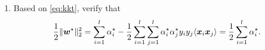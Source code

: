 \documentclass[a4paper]{article}
\begin{document}
{\begin{enumerate}
\begin{enumerate}
        \begin{proof}
            From a condition from the \eqref{eq:kkt}:
            \begin{equation*}
            \begin{aligned}
              & \sum_{i=1}^{l}\alpha_i^{\star}\left[y_i(\bw^{\star\T}\bx_i+b^{\star})-1\right] = 0 &\\
              & \sum_{i=1}^{l}\alpha_i^{\star}\left[(\bw^{\star\T}\bx_i+b^{\star})-y_i\right]  = 0 & 
            \end{aligned}
            \end{equation*}
            There is at least one $\alpha_j^{\star} > 0$ 
                that let $\bw^{\star\T}\bx_j + b^{\star} - y_j = 0$.\\
            As the data are linearly separable, for any $y_j=1$, $\bw^{\star}\bx_j + b^{\star} \geq 1$,
            So that \begin{equation*}
                \min_{j:y_j=1}\{\bw^{\star}\bx_j + b^{\star}\} = 1
            \tag{1.a.1}
            \end{equation*}
            Similarily, for any $y_j=-1$, $\bw^{\star}\bx_j + b^{\star} \leq -1$,
            So that \begin{equation*}
                \max_{j:y_j=-1}\{\bw^{\star}\bx_j + b^{\star}\} = -1
            \tag{1.a.2}
            \end{equation*}
            Sum up the equation {1.a.1} and {1.a.2}, here it is:
            \begin{equation*}
                b^{\star} = -\frac12 \left(\max_{i\colon y_i=-1} \bw^{\star\T}\bx_i + \min_{i\colon y_i=1}
                    \bw^{\star\T}\bx_i \right).
            \end{equation*}
        \end{proof}

    \item Based on \eqref{eq:kkt}, verify that
        \begin{equation*}
            \frac{1}{2} \| \bm{w}^{\star} \| _{2}^{2} = \sum_{i=1}^{l}\alpha_i^{\star} - 
            \frac{1}{2} \sum_{i=1}^{l} \sum_{j=1}^{l} \alpha_i^{\star} \alpha_j^{\star}
            y_i y_j \langle \bm{x}_i \bm{x}_j \rangle = \frac12 \sum_{i=1}^{l}\alpha_i^{\star}.
        \end{equation*}
        

\end{enumerate}
\end{enumerate}}
\end{document}
